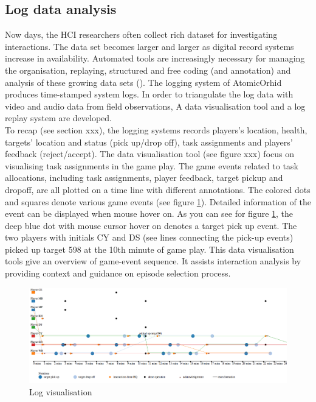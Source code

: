 \subsection{Log data analysis} 
Now days, the HCI researchers often collect rich dataset for investigating interactions. The data set becomes larger and larger as digital record systems increase in availability. Automated tools are increasingly necessary for managing the organisation, replaying, structured and free coding (and annotation) and analysis of these growing data sets (). The logging system of AtomicOrhid produces time-stamped system logs. In order to triangulate the log data with video and audio data from field observations, A data visualisation tool and a log replay system are developed.  \\

To recap (see section xxx), the logging systems records players's location, health, targets' location and status (pick up/drop off), task assignments and players' feedback (reject/accept). The data visualisation tool (see figure xxx) focus on visualising task assignments in the game play. The game events related to task allocations, including task assignments, player feedback, target pickup and dropoff, are all plotted on a time line with different annotations. The   colored dots and squares denote various game events (see figure \ref{fig:logvis}). Detailed information of the event can be displayed when mouse hover on. As you can see for figure \ref{fig:logvis}, the deep blue dot with mouse cursor hover on denotes a target pick up event. The two players with initials CY and DS (see lines connecting the pick-up events) picked up target 598 at the 10th minute of game play. This data visualisation tools give an overview of game-event sequence. It assists interaction analysis by providing context and guidance on episode selection process. \\

\begin{figure}[h]
  \centering
  \includegraphics[width=1\textwidth]{img/methodology/logVisualisation}
  \caption{Log visualisation}
  \label{fig:logvis}
\end{figure}

